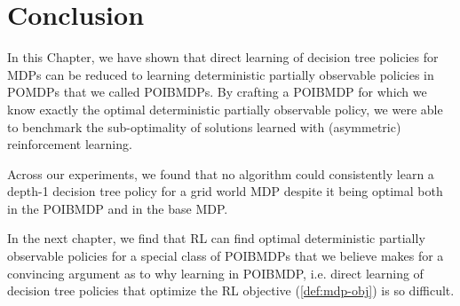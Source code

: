 \section{Conclusion}
In this Chapter, we have shown that direct learning of decision tree policies for MDPs can be reduced to learning deterministic partially observable policies in POMDPs that we called POIBMDPs.
By crafting a POIBMDP for which we know exactly the optimal deterministic partially observable policy, we were able to benchmark the sub-optimality of solutions learned with (asymmetric) reinforcement learning.

Across our experiments, we found that no algorithm could consistently learn a depth-1 decision tree policy for a grid world MDP despite it being optimal both in the POIBMDP and in the base MDP.

In the next chapter, we find that RL can find optimal deterministic partially observable policies for a special class of POIBMDPs that we believe makes for a convincing argument as to why learning in POIBMDP, i.e. direct learning of decision tree policies that optimize the RL objective (\ref{def:mdp-obj}) is so difficult.
